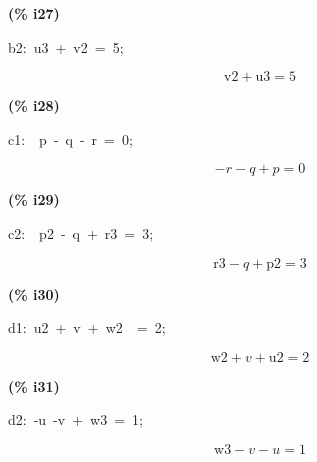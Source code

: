 \documentclass[fleqn]{article}
\begin{document}
\noindent
\begin{minipage}[t]{4.000000em}\color{red}\bfseries
(\% i27)	
\end{minipage}
\begin{minipage}[t]{\textwidth}\color{blue}
b2:\ u3\ +\ v2\ =\ 5;
\end{minipage}
\[\displaystyle \tag{b2} 
\ensuremath{\mathrm{v2}}\mathop{+}\ensuremath{\mathrm{u3}}\mathop{=}5\mbox{}
\]


\noindent
\begin{minipage}[t]{4.000000em}\color{red}\bfseries
(\% i28)	
\end{minipage}
\begin{minipage}[t]{\textwidth}\color{blue}
c1:\ \ p\ -\ q\ -\ r\ =\ 0;
\end{minipage}
\[\displaystyle \tag{c1} 
\mathop{-}r\mathop{-}q\mathop{+}p\mathop{=}0\mbox{}
\]


\noindent
\begin{minipage}[t]{4.000000em}\color{red}\bfseries
(\% i29)	
\end{minipage}
\begin{minipage}[t]{\textwidth}\color{blue}
c2:\ \ p2\ -\ q\ +\ r3\ =\ 3;
\end{minipage}
\[\displaystyle \tag{c2} 
\ensuremath{\mathrm{r3}}\mathop{-}q\mathop{+}\ensuremath{\mathrm{p2}}\mathop{=}3\mbox{}
\]


\noindent
\begin{minipage}[t]{4.000000em}\color{red}\bfseries
(\% i30)	
\end{minipage}
\begin{minipage}[t]{\textwidth}\color{blue}
d1:\ u2\ +\ v\ +\ w2\ \ =\ 2;
\end{minipage}
\[\displaystyle \tag{d1} 
\ensuremath{\mathrm{w2}}\mathop{+}v\mathop{+}\ensuremath{\mathrm{u2}}\mathop{=}2\mbox{}
\]


\noindent
\begin{minipage}[t]{4.000000em}\color{red}\bfseries
(\% i31)	
\end{minipage}
\begin{minipage}[t]{\textwidth}\color{blue}
d2:\ -u\ -v\ +\ w3\ =\ 1;
\end{minipage}
\[\displaystyle \tag{d2} 
\ensuremath{\mathrm{w3}}\mathop{-}v\mathop{-}u\mathop{=}1\mbox{}
\]
\end{document}
